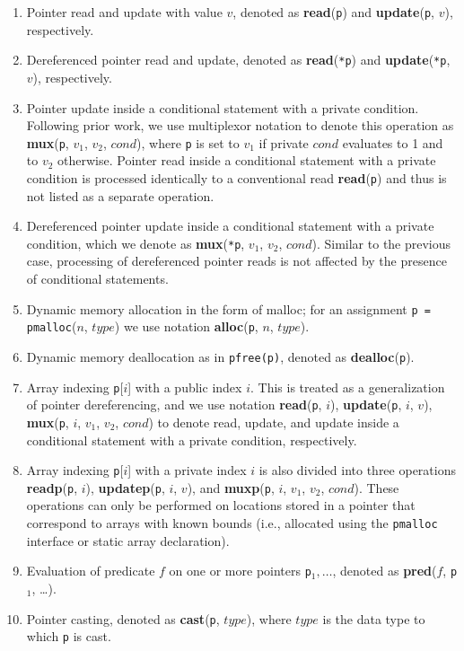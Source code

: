\documentclass[11pt]{article}
\begin{document}
\begin{enumerate}
  \item Pointer read and update with value $v$, denoted as 
    \textbf{read}(\texttt{p}) and \textbf{update}(\texttt{p}, $v$),
    respectively. 
  \item Dereferenced pointer read and update, denoted as
    \textbf{read}(\texttt{*p}) and \textbf{update}(\texttt{*p}, $v$),
    respectively.
  \item Pointer update inside a conditional statement with a private
    condition. Following prior work, we use multiplexor notation to denote
    this operation as \textbf{mux}(\texttt{p}, $v_1$, $v_2$, $cond$), where
    \texttt{p} is set to $v_1$ if private $cond$ evaluates to 1 and to $v_2$
    otherwise. Pointer read inside a conditional statement with a private
    condition is processed identically to a conventional read
    \textbf{read}(\texttt{p}) and thus is not listed as a separate
    operation. 
  \item Dereferenced pointer update inside a conditional statement with a
    private condition, which we denote as \textbf{mux}(\texttt{*p}, $v_1$,
    $v_2$, $cond$). Similar to the previous case, processing of dereferenced
    pointer reads is not affected by the presence of conditional statements.
  \item Dynamic memory allocation in the form of malloc; for an assignment
    \texttt{p = pmalloc}($n$, $type$) we use notation
    \textbf{alloc}(\texttt{p}, $n$, $type$). 
  \item Dynamic memory deallocation as in \texttt{pfree(p)},
    denoted as \textbf{dealloc}(\texttt{p}).
  \item Array indexing \texttt{p}[$i$] with a public index $i$. This is
    treated as a generalization of pointer dereferencing, and we use notation
    \textbf{read}(\texttt{p}, $i$), \textbf{update}(\texttt{p}, $i$, $v$),
    \textbf{mux}(\texttt{p}, $i$, $v_1$, $v_2$, $cond$) to denote read,
    update, and update inside a conditional statement with a private
    condition, respectively.
  \item Array indexing \texttt{p}[$i$] with a private index $i$ is also
    divided into three operations \textbf{readp}(\texttt{p}, $i$),
    \textbf{updatep}(\texttt{p}, $i$, $v$), and \textbf{muxp}(\texttt{p},
    $i$, $v_1$, $v_2$, $cond$). These operations can only be performed on
    locations stored in a pointer that correspond to arrays with known
    bounds (i.e., allocated using the \texttt{pmalloc} interface or static
    array declaration). 
  \item Evaluation of predicate $f$ on one or more pointers \texttt{p}$_1,
    {\ldots}$, denoted as \textbf{pred}($f$, \texttt{p}$_1$, {\ldots}).
  \item Pointer casting, denoted as \textbf{cast}(\texttt{p},
    $type$), where $type$ is the data type to which \texttt{p} is cast.
\end{enumerate}
\end{document}
